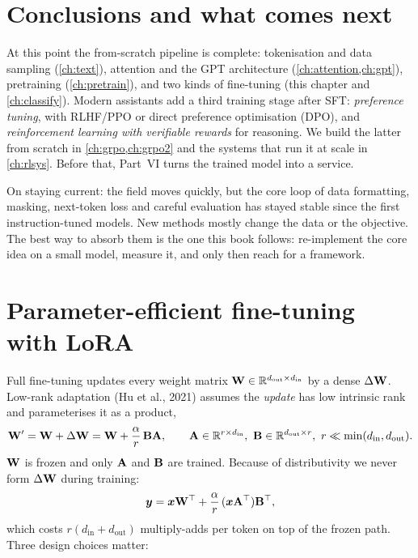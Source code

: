 \section{Conclusions and what comes next}\label{sec:instruct:conclusions}

At this point the from-scratch pipeline is complete: tokenisation and data sampling
(\cref{ch:text}), attention and the GPT architecture (\cref{ch:attention,ch:gpt}),
pretraining (\cref{ch:pretrain}), and two kinds of fine-tuning (this chapter and
\cref{ch:classify}). Modern assistants add a third training stage after SFT:
\emph{preference tuning}, with RLHF/PPO or direct preference optimisation (DPO), and
\emph{reinforcement learning with verifiable rewards} for reasoning. We build the
latter from scratch in \cref{ch:grpo,ch:grpo2} and the systems that run it at scale in
\cref{ch:rlsys}. Before that, Part~VI turns the trained model into a service.

On staying current: the field moves quickly, but the core loop of data formatting,
masking, next-token loss and careful evaluation has stayed stable since the first
instruction-tuned models. New methods mostly change the data or the objective. The
best way to absorb them is the one this book follows: re-implement the core idea on a
small model, measure it, and only then reach for a framework.

\section{Parameter-efficient fine-tuning with LoRA}\label{sec:instruct:lora}

Full fine-tuning updates every weight matrix $\mathbf{W}\in\mathbb{R}^{d_\text{out}\times d_\text{in}}$
by a dense $\Delta\mathbf{W}$. Low-rank adaptation (Hu et al., 2021) assumes the
\emph{update} has low intrinsic rank and parameterises it as a product,
\begin{equation}
\mathbf{W}' = \mathbf{W} + \Delta\mathbf{W} = \mathbf{W} + \frac{\alpha}{r}\,\mathbf{B}\mathbf{A},\qquad
\mathbf{A}\in\mathbb{R}^{r\times d_\text{in}},\ \mathbf{B}\in\mathbb{R}^{d_\text{out}\times r},\ r\ll\min(d_\text{in},d_\text{out}).
\label{eq:instruct:lora}
\end{equation}
$\mathbf{W}$ is frozen and only $\mathbf{A}$ and $\mathbf{B}$ are trained. Because of
distributivity we never form $\Delta\mathbf{W}$ during training:
\begin{equation}
\bm{y} = \bm{x}\mathbf{W}^\top + \frac{\alpha}{r}\,(\bm{x}\mathbf{A}^\top)\mathbf{B}^\top,
\end{equation}
which costs $r(d_\text{in}+d_\text{out})$ multiply-adds per token on top of the frozen
path. Three design choices matter:

